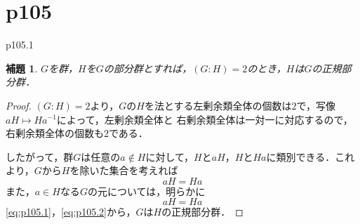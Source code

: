 \documentclass[dvipdfmx,uplatex,11pt]{jsarticle}
\theoremstyle{mytheorem}
\newtheorem{lemm}{補題}[section]
\begin{document}
        \section{p105}

        p105.1
        \begin{lemm}
            \label{lem:p105.1}
            $G$を群，$H$を$G$の部分群とすれば，$(G:H)=2$のとき，$H$は$G$の正規部分群．
        \end{lemm}

        \begin{proof}
            $(G:H)=2$より，$G$の$H$を法とする左剰余類全体の個数は$2$で，写像$aH \longmapsto H a^{-1}$によって，左剰余類全体と
            右剰余類全体は一対一に対応するので，右剰余類全体の個数も$2$である．
            
            したがって，群$G$は任意の$ a \notin H$に対して，$H$と$aH$，$H$と$Ha$に類別できる．これより，$G$から$H$を除いた集合を考えれば
            \begin{equation}
                \label{eq:p105.1}
                aH = Ha
            \end{equation}
            また，$a \in H$なる$G$の元については，明らかに
            \begin{equation}
                \label{eq:p105.2}
                aH =Ha 
            \end{equation}
            \eqref{eq:p105.1}，\eqref{eq:p105.2}から，$G$は$H$の正規部分群．
        \end{proof}
\end{document}
